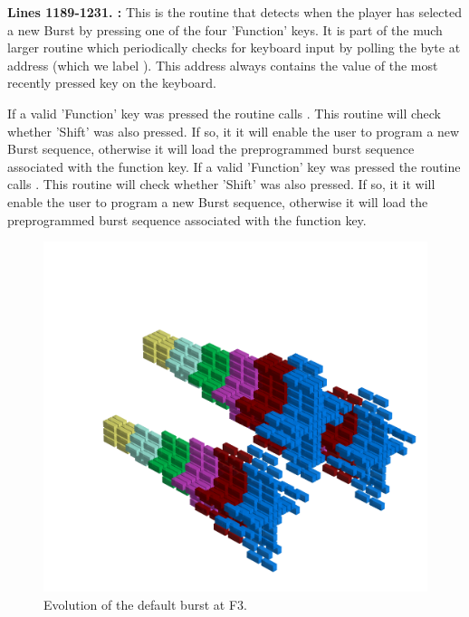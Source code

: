 \begin{figure}
%
\end{figure}
\textbf{Lines 1189-1231. :} This is the routine that detects when the player has selected a new
Burst by pressing one of the four 'Function' keys. It is part of the much larger routine  which periodically checks
for keyboard input by polling the byte at address  (which we label ). This address always
contains the value of the most recently pressed key on the keyboard.

If a valid 'Function' key was pressed the routine calls . This routine
will check whether 'Shift' was also pressed. If so, it it will enable the user to program a new
Burst sequence, otherwise it will load the preprogrammed burst sequence associated with the function key.
If a valid 'Function' key was pressed the routine calls . This routine
will check whether 'Shift' was also pressed. If so, it it will enable the user to program a new
Burst sequence, otherwise it will load the preprogrammed burst sequence associated with the function key.

\clearpage
\begin{figure}[H]
    \centering
    \begin{adjustbox}{width=12cm,center}
      \includegraphics[width=12cm]{src/patterns/bursts/pattern1-45.png}%
    \end{adjustbox}
\caption{Evolution of the default burst at F3.}
\end{figure}
\clearpage

